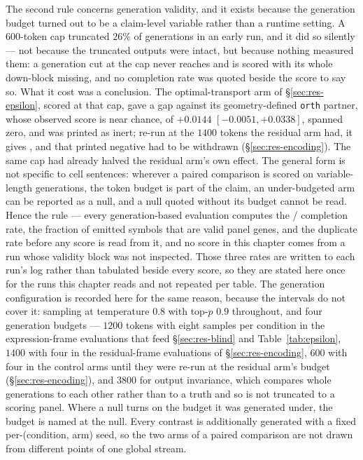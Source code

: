 The second rule concerns generation validity, and it exists because the generation budget turned out
to be a claim-level variable rather than a runtime setting. A $600$-token cap truncated $26\%$ of
generations in an early run, and it did so silently --- not because the truncated outputs were
intact, but because nothing measured them: a generation cut at the cap never reaches \DOWN{} and is
scored with its whole down-block missing, and no completion rate was quoted beside the score to say
so. What it cost was a conclusion. The optimal-transport arm of
\S\ref{sec:res-epsilon}, scored at that cap, gave a gap against its geometry-defined \texttt{orth}
partner, whose observed score is near chance, of
$+0.0144$ \nolinebreak[3]$[-0.0051, +0.0338]$, spanned zero, and was printed as inert; re-run at the
$1400$ tokens the residual arm had, it gives , and that printed
negative had to be withdrawn (\S\ref{sec:res-encoding}). The same cap had already halved the
residual arm's own effect. The general form is not specific to cell sentences: wherever a paired
comparison is scored on variable-length generations, the token budget is part of the claim, an
under-budgeted arm can be reported as a null, and a null quoted without its budget cannot be read.
Hence the rule --- every generation-based evaluation computes the \ENDCELL{}/\DOWN{} completion
rate, the fraction of emitted symbols that are valid panel genes, and the duplicate rate before any
score is read from it, and no score in this chapter comes from a run whose validity block was not
inspected. Those three rates are written to each run's log rather than tabulated
beside every score, so they are stated here once for the runs this chapter reads and not repeated
per table. The generation configuration is recorded here for the same reason, because the intervals
do not cover it: sampling at temperature $0.8$ with top-$p$ $0.9$ throughout, and four generation
budgets --- $1200$ tokens with eight samples per condition in the expression-frame evaluations that
feed \S\ref{sec:res-blind} and Table~\ref{tab:epsilon}, $1400$ with four in the residual-frame
evaluations of \S\ref{sec:res-encoding}, $600$ with four in the control arms until they were
re-run at the residual arm's budget (\S\ref{sec:res-encoding}), and $3800$ for output invariance,
which compares whole generations to each other rather than to a truth and so is not truncated to a
scoring panel. Where a null turns on the budget it
was generated under, the budget is named at the null. Every
contrast is additionally generated with a fixed per-(condition, arm) seed, so the two arms of a
paired comparison are not drawn from different points of one global stream.

